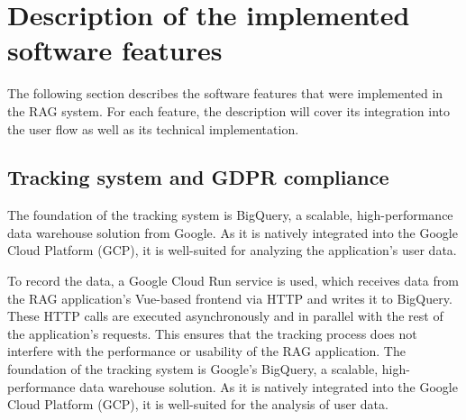 \documentclass[
	english,
	ruledheaders=section,%
	class=report,%
	thesis={type=bachelor},%
	accentcolor=1b,%
	custommargins=true,%
	marginpar=false,%
	parskip=half-,%
	fontsize=11pt,%
	DIV=14,
]{tudapub}
\begin{document}
\section{Description of the implemented software features}
The following section describes the software features that were implemented in the RAG system. For each feature, the description will cover its integration into the user flow as well as its technical implementation.
\subsection{Tracking system and GDPR compliance}
The foundation of the tracking system is BigQuery, a scalable, high-performance data warehouse solution from Google. As it is natively integrated into the Google Cloud Platform (GCP), it is well-suited for analyzing the application's user data.

To record the data, a Google Cloud Run service is used, which receives data from the RAG application's Vue-based frontend via HTTP and writes it to BigQuery. These HTTP calls are executed asynchronously and in parallel with the rest of the application's requests. This ensures that the tracking process does not interfere with the performance or usability of the RAG application.
The foundation of the tracking system is Google's BigQuery, a scalable, high-performance data warehouse solution. As it is natively integrated into the Google Cloud Platform (GCP), it is well-suited for the analysis of user data.
\end{document}
